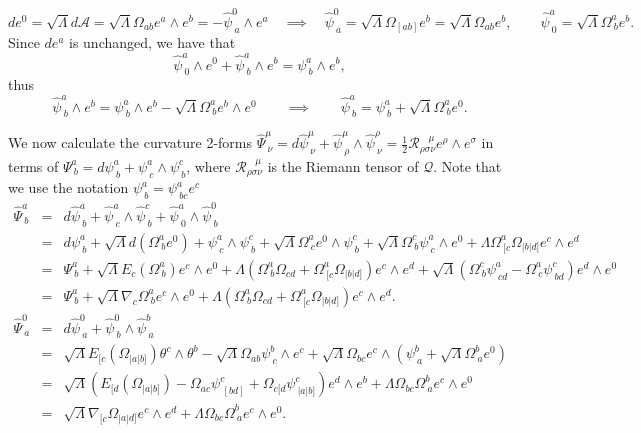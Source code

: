 \[
{d}e^{0}=\sqrt{\Lambda}{d}\mathcal{A}=\sqrt{\Lambda}\Omega_{ab}e^{a}\wedge e^{b}=-\hat{\psi}_{\ a}^{0}\wedge e^{a}\quad\implies\quad\hat{\psi}_{\ a}^{0}=\sqrt{\Lambda}\Omega_{[ab]}e^{b}=\sqrt{\Lambda}\Omega_{ab}e^{b},\qquad\hat{\psi}_{\ 0}^{a}=\sqrt{\Lambda}\Omega_{\ b}^{a}e^{b}.
\]
Since ${d}e^{a}$ is unchanged, we have that
\[
\hat{\psi}_{\ 0}^{a}\wedge e^{0}+\hat{\psi}_{\ b}^{a}\wedge e^{b}=\psi_{\ b}^{a}\wedge e^{b},
\]
thus
\[
\hat{\psi}_{\ b}^{a}\wedge e^{b}=\psi_{\ b}^{a}\wedge e^{b}-\sqrt{\Lambda}\Omega_{\ b}^{a}e^{b}\wedge e^{0}\qquad\implies\qquad\hat{\psi}_{\ b}^{a}=\psi_{\ b}^{a}+\sqrt{\Lambda}\Omega_{\ b}^{a}e^{0}.
\]


We now calculate the curvature 2-forms $\hat{\Psi}_{\ \nu}^{\mu}={d}\hat{\psi}_{\ \nu}^{\mu}+\hat{\psi}_{\ \rho}^{\mu}\wedge\hat{\psi}_{\ \nu}^{\rho}=\frac{1}{2}\mathcal{R}_{\rho\sigma\nu}^{\ \ \ \ \mu}e^{\rho}\wedge e^{\sigma}$
in terms of $\Psi_{\ b}^{a}={d}\psi_{\ b}^{a}+\psi_{\ c}^{a}\wedge\psi_{\ b}^{c}$,
where $\mathcal{R}_{\rho\sigma\nu}^{\ \ \ \ \mu}$ is the Riemann
tensor of $\mathcal{Q}$. Note that we use the notation $\psi_{\ b}^{a}=\psi_{\ bc}^{a}e^{c}$
\begin{eqnarray*}
\hat{\Psi}_{\ b}^{a} & = & {d}\hat{\psi}_{\ b}^{a}+\hat{\psi}_{\ c}^{a}\wedge\hat{\psi}_{\ b}^{c}+\hat{\psi}_{\ 0}^{a}\wedge\hat{\psi}_{\ b}^{0}\\
 & = & {d}\psi_{\ b}^{a}+{\sqrt{\Lambda}{d}}(\Omega_{\ b}^{a}e^{0})+\psi_{\ c}^{a}\wedge\psi_{\ b}^{c}+\sqrt{\Lambda}\Omega_{\ c}^{a}e^{0}\wedge\psi_{\ b}^{c}+\sqrt{\Lambda}\Omega_{\ b}^{c}\psi_{\ c}^{a}\wedge e^{0}+\Lambda\Omega_{\ [c}^{a}\Omega_{|b|d]}e^{c}\wedge e^{d}\\
 & = & \Psi_{\ b}^{a}+\sqrt{\Lambda}E_{c}(\Omega_{\ b}^{a})e^{c}\wedge e^{0}+\Lambda(\Omega_{\ b}^{a}\Omega_{cd}+\Omega_{\ [c}^{a}\Omega_{|b|d]})e^{c}\wedge e^{d}+\sqrt{\Lambda}(\Omega_{\ b}^{c}\psi_{\ cd}^{a}-\Omega_{\ c}^{a}\psi_{\ bd}^{c})e^{d}\wedge e^{0}\\
 & = & \Psi_{\ b}^{a}+\sqrt{\Lambda}\nabla_{c}\Omega_{\ b}^{a}e^{c}\wedge e^{0}+\Lambda(\Omega_{\ b}^{a}\Omega_{cd}+\Omega_{\ [c}^{a}\Omega_{|b|d]})e^{c}\wedge e^{d}.\\
\hat{\Psi}_{\ a}^{0} & = & {d}\hat{\psi}_{\ a}^{0}+\hat{\psi}_{\ b}^{0}\wedge\hat{\psi}_{\ a}^{b}\\
 & = & \sqrt{\Lambda}E_{[c}(\Omega_{|a|b]})\theta^{c}\wedge\theta^{b}-\sqrt{\Lambda}\Omega_{ab}\psi_{\ c}^{b}\wedge e^{c}+\sqrt{\Lambda}\Omega_{bc}e^{c}\wedge(\psi_{\ a}^{b}+\sqrt{\Lambda}\Omega_{\ a}^{b}e^{0})\\
 & = & \sqrt{\Lambda}(E_{[d}(\Omega_{|a|b]})-\Omega_{ac}\psi_{\ [bd]}^{c}+\Omega_{c[d}\psi_{\ |a|b]}^{c})e^{d}\wedge e^{b}+\Lambda\Omega_{bc}\Omega_{\ a}^{b}e^{c}\wedge e^{0}\\
 & = & \sqrt{\Lambda}\nabla_{[c}\Omega_{|a|d]}e^{c}\wedge e^{d}+\Lambda\Omega_{bc}\Omega_{\ a}^{b}e^{c}\wedge e^{0}.
\end{eqnarray*}
